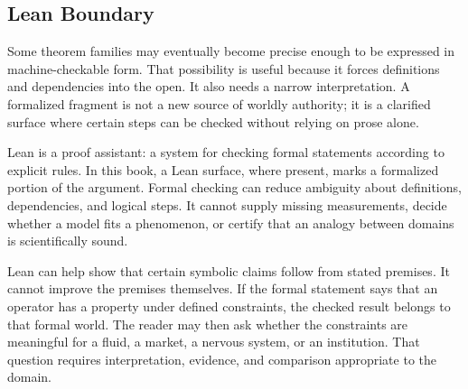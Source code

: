 \documentclass[11pt,a4paper,openany]{book}
\begin{document}
\subsection{Lean Boundary}
Some theorem families may eventually become precise enough to be expressed in machine-checkable form. That possibility is useful because it forces definitions and dependencies into the open. It also needs a narrow interpretation. A formalized fragment is not a new source of worldly authority; it is a clarified surface where certain steps can be checked without relying on prose alone. \cite{goldenfeld_lectures,kadanoff_scaling}\par
Lean is a proof assistant: a system for checking formal statements according to explicit rules. In this book, a Lean surface, where present, marks a formalized portion of the argument. Formal checking can reduce ambiguity about definitions, dependencies, and logical steps. It cannot supply missing measurements, decide whether a model fits a phenomenon, or certify that an analogy between domains is scientifically sound.\par
Lean can help show that certain symbolic claims follow from stated premises. It cannot improve the premises themselves. If the formal statement says that an operator has a property under defined constraints, the checked result belongs to that formal world. The reader may then ask whether the constraints are meaningful for a fluid, a market, a nervous system, or an institution. That question requires interpretation, evidence, and comparison appropriate to the domain.\par
\end{document}
